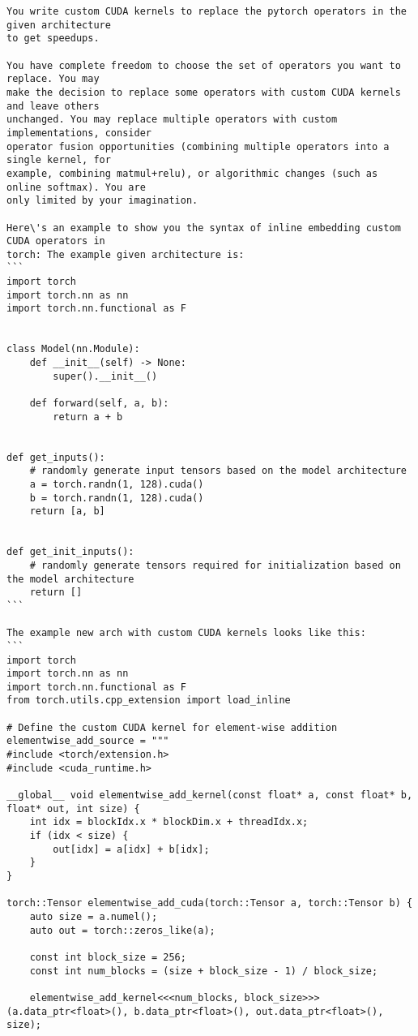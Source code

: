 \begin{lstlisting}
You write custom CUDA kernels to replace the pytorch operators in the given architecture 
to get speedups. 

You have complete freedom to choose the set of operators you want to replace. You may
make the decision to replace some operators with custom CUDA kernels and leave others
unchanged. You may replace multiple operators with custom implementations, consider
operator fusion opportunities (combining multiple operators into a single kernel, for
example, combining matmul+relu), or algorithmic changes (such as online softmax). You are
only limited by your imagination.

Here\'s an example to show you the syntax of inline embedding custom CUDA operators in 
torch: The example given architecture is:
```
import torch
import torch.nn as nn
import torch.nn.functional as F


class Model(nn.Module):
    def __init__(self) -> None:
        super().__init__()

    def forward(self, a, b):
        return a + b


def get_inputs():
    # randomly generate input tensors based on the model architecture
    a = torch.randn(1, 128).cuda()
    b = torch.randn(1, 128).cuda()
    return [a, b]


def get_init_inputs():
    # randomly generate tensors required for initialization based on the model architecture
    return []
```

The example new arch with custom CUDA kernels looks like this: 
```
import torch
import torch.nn as nn
import torch.nn.functional as F
from torch.utils.cpp_extension import load_inline

# Define the custom CUDA kernel for element-wise addition
elementwise_add_source = """
#include <torch/extension.h>
#include <cuda_runtime.h>

__global__ void elementwise_add_kernel(const float* a, const float* b, float* out, int size) {
    int idx = blockIdx.x * blockDim.x + threadIdx.x;
    if (idx < size) {
        out[idx] = a[idx] + b[idx];
    }
}

torch::Tensor elementwise_add_cuda(torch::Tensor a, torch::Tensor b) {
    auto size = a.numel();
    auto out = torch::zeros_like(a);

    const int block_size = 256;
    const int num_blocks = (size + block_size - 1) / block_size;

    elementwise_add_kernel<<<num_blocks, block_size>>>(a.data_ptr<float>(), b.data_ptr<float>(), out.data_ptr<float>(), size);


\end{lstlisting}
